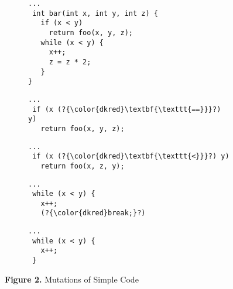 \begin{figure}[h!]
\begin{subfigure}{.65\columnwidth}
\begin{lstlisting}[basicstyle=\scriptsize\ttfamily,numbers=none,xleftmargin=0.7em,xrightmargin=.7em]
...
 int bar(int x, int y, int z) {
   if (x < y)
     return foo(x, y, z);
   while (x < y) {
     x++;
     z = z * 2;
   }
}
\end{lstlisting}
\end{subfigure}
\begin{subfigure}{.45\columnwidth}
\begin{lstlisting}[basicstyle=\scriptsize\ttfamily,numbers=none,xleftmargin=0.7em,xrightmargin=.7em]
...
 if (x (?{\color{dkred}\textbf{\texttt{==}}}?) y)
   return foo(x, y, z);
\end{lstlisting}
\end{subfigure}
\hspace{.2em}
\begin{subfigure}{.45\columnwidth}
\begin{lstlisting}[basicstyle=\scriptsize\ttfamily,numbers=none,xleftmargin=0.7em,xrightmargin=.7em]
...
 if (x (?{\color{dkred}\textbf{\texttt{<}}}?) y)
   return foo(x, z, y);
\end{lstlisting}
\end{subfigure}
\begin{subfigure}{.45\columnwidth}
\begin{lstlisting}[basicstyle=\scriptsize\ttfamily,numbers=none,xleftmargin=0.7em,xrightmargin=.7em]
...
 while (x < y) {
   x++;
   (?{\color{dkred}break;}?)
\end{lstlisting}
\end{subfigure}
\hspace{.2em}
\begin{subfigure}{.45\columnwidth}
\begin{lstlisting}[basicstyle=\scriptsize\ttfamily,numbers=none,xleftmargin=0.7em,xrightmargin=.7em]
...
 while (x < y) {
   x++; 
 }
\end{lstlisting}
\end{subfigure}
\label{fig:fopexample}
\caption*{\normalsize\textbf{Figure 2.} Mutations of  Simple Code} %
\end{figure}


